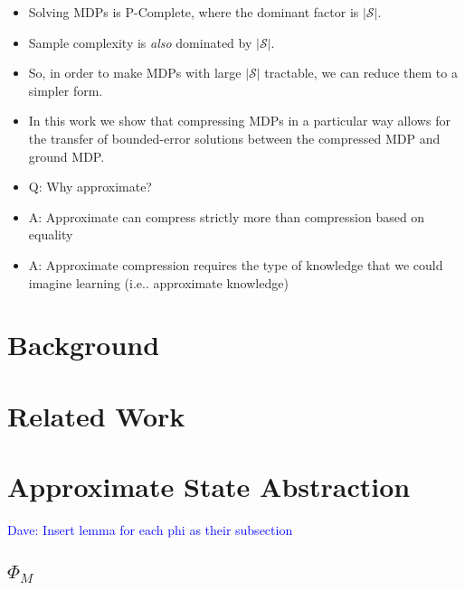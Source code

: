 \documentclass{article}
\newcommand\dnote[1]{\textcolor{blue}{Dave: #1}}
\begin{document}
\begin{itemize}
\item Solving MDPs is P-Complete, where the dominant factor is $|\mathcal{S}|$.
\item Sample complexity is {\it also} dominated by $|\mathcal{S}|$.
\item So, in order to make MDPs with large $|\mathcal{S}|$ tractable, we can reduce them to a simpler form.
\item In this work we show that compressing MDPs in a particular way allows for the transfer of bounded-error solutions between the compressed MDP and ground MDP.
\item Q: Why approximate?
\item A: Approximate can compress strictly more than compression based on equality
\item A: Approximate compression requires the type of knowledge that we could imagine learning (i.e.. approximate knowledge)
\end{itemize}


\section{Background}




\section{Related Work}






\section{Approximate State Abstraction}

\dnote{Insert lemma for each phi as their subsection}


\subsection{$\Phi_M$}
\end{document}
